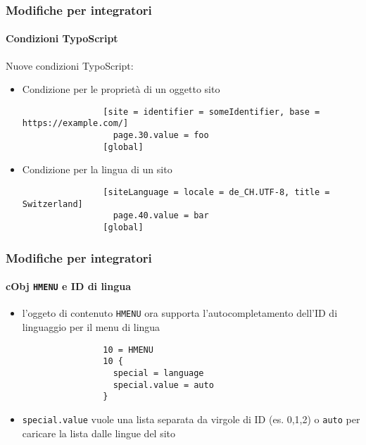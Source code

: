 \begin{frame}[fragile]
	\frametitle{Modifiche per integratori}
	\framesubtitle{Condizioni TypoScript}

	Nuove condizioni TypoScript:

	\begin{itemize}
		\item Condizione per le proprietà di un oggetto sito

			\begin{lstlisting}
				[site = identifier = someIdentifier, base = https://example.com/]
				  page.30.value = foo
				[global]
			\end{lstlisting}

		\item Condizione per la lingua di un sito

			\begin{lstlisting}
				[siteLanguage = locale = de_CH.UTF-8, title = Switzerland]
				  page.40.value = bar
				[global]
			\end{lstlisting}

	\end{itemize}

\end{frame}


\begin{frame}[fragile]
	\frametitle{Modifiche per integratori}
	\framesubtitle{cObj \texttt{HMENU} e ID di lingua}


	\begin{itemize}
		\item l'oggeto di contenuto \texttt{HMENU} ora supporta l'autocompletamento 
			dell'ID di linguaggio per il menu di lingua

			\begin{lstlisting}
				10 = HMENU
				10 {
				  special = language
				  special.value = auto
				}
  			\end{lstlisting}

		\item \texttt{special.value} vuole una lista separata da virgole di ID
			(es. 0,1,2) o \texttt{auto} per caricare la lista dalle lingue del sito

	\end{itemize}

\end{frame}

